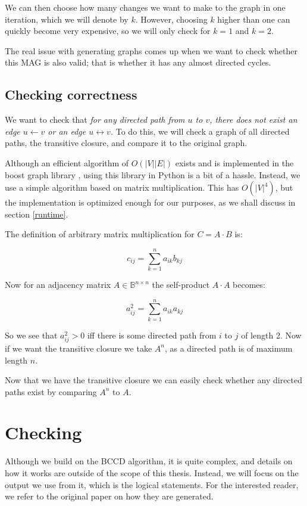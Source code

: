 \documentclass[11pt,a4paper]{report}
\theoremstyle{definition}
\begin{document}
We can then choose how many changes we want to make to the graph in one
iteration, which we will denote by $k$. However, choosing $k$ higher than
one can quickly become very expensive, so we will only check for $k=1$ and
$k=2$.

The real issue with generating graphs comes up when we want to check
whether this MAG is also valid; that is whether it has any almost directed
cycles.

\subsection{Checking correctness}\label{transitive_closure}
We want to check that \emph{for any directed path from $u$ to $v$, there
does not exist an edge $u \leftarrow v$ or an edge $u \leftrightarrow v$.
} To do this, we will check a graph of all directed paths, the transitive
closure, and compare it to the original graph.

Although an efficient algorithm of $O(|V||E|)$ exists
\cite{purdomTransitiveClosureAlgorithm1970} and is implemented in the
boost graph library \cite{siekBoostGraphLibrary2002}, using this library
in Python is a bit of a hassle. Instead, we use a simple algorithm based
on matrix multiplication. This has $O(|V|^4)$, but the implementation is
optimized enough for our purposes, as we shall discuss in section
\ref{runtime}.

The definition of arbitrary matrix multiplication for $C = A \cdot B$ is:

\begin{equation*}
  c_{ij} = \sum ^n_{k=1} a_{ik}b_{kj}
\end{equation*}

Now for an adjacency matrix $A \in \mathbb{B}^{n \times n}$ the
self-product $A \cdot A$ becomes:

\begin{equation*}
  a^2_{ij} = \sum ^n_{k=1} a_{ik}a_{kj}
\end{equation*}

So we see that $a^2_{ij} > 0$ iff there is some directed path from $i$ to
$j$ of length 2. Now if we want the transitive closure we take $A^n$, as a
directed path is of maximum length $n$.

Now that we have the transitive closure we can easily check whether any
directed paths exist by comparing $A^n$ to $A$.

\section{Checking}\label{checking}
Although we build on the BCCD algorithm, it is quite complex, and details
on how it works are outside of the scope of this thesis. Instead, we will
focus on the output we use from it, which is the logical statements. For
the interested reader, we refer to the original paper on how they are
generated\cite{claassenBayesianApproachConstraint2012}.
\end{document}
